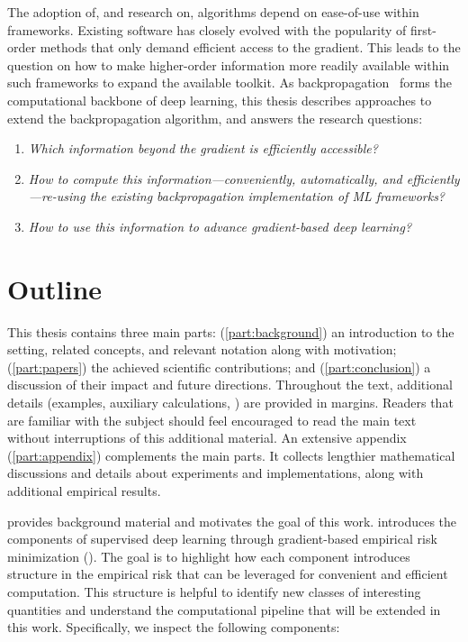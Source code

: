 The adoption of, and research on, algorithms depend on ease-of-use within
frameworks. Existing software has closely evolved with the popularity of
first-order methods that only demand efficient access to the gradient. This
leads to the question on how to make higher-order information more readily
available within such frameworks to expand the available toolkit. As
backpropagation~\cite{rumelhart1986learning} forms the computational backbone of
deep learning, this thesis describes approaches to extend the backpropagation
algorithm, and answers the research questions:
\begin{enumerate}[start=1,label={\bfseries(Q\arabic*)},ref={(Q\arabic*)},leftmargin=35pt]\label{enum:background::Questions}
\item \emph{Which information beyond the gradient is efficiently
    accessible?}\label{enum:background::Q1}

\item \emph{How to compute this information---conveniently, automatically, and
    efficiently---re-using the existing backpropagation implementation of ML
    frameworks?}\label{enum:background::Q2}

\item \emph{How to use this information to advance gradient-based deep
    learning?}\label{enum:background::Q3}
\end{enumerate}

\section{Outline}

This thesis contains three main parts: (\ref{part:background}) an introduction
to the setting, related concepts, and relevant notation along with motivation;
(\ref{part:papers}) the achieved scientific contributions; and
(\ref{part:conclusion}) a discussion of their impact and future directions.
Throughout the text, additional details (examples, auxiliary calculations, \etc)
are provided in margins. Readers that are familiar with the subject should feel
encouraged to read the main text without interruptions of this additional
material. An extensive appendix (\ref{part:appendix}) complements the main
parts. It collects lengthier mathematical discussions and details about
experiments and implementations, along with additional empirical results.

 provides background material and motivates the goal of
this work.  introduces the components of
supervised deep learning through gradient-based empirical risk minimization
(). The goal is to highlight how each
component introduces structure in the empirical risk that can be leveraged for
convenient and efficient computation. This structure is helpful to identify new
classes of interesting quantities and understand the computational pipeline that
will be extended in this work. Specifically, we inspect the following
components:

